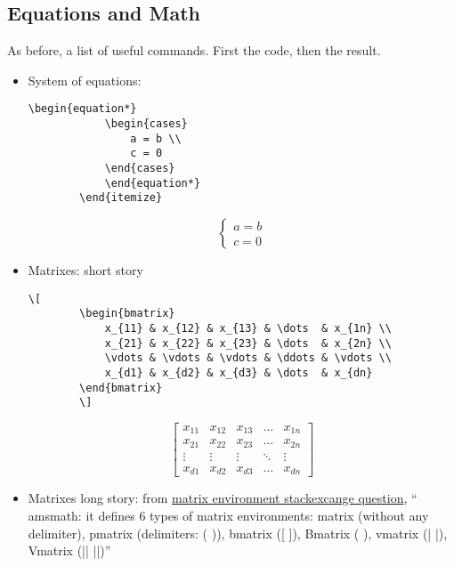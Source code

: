 



\subsection{Equations and Math}
\par As before, a list of useful commands. First the code, then the result.
\begin{itemize}
    \item System of equations:

    \begin{lstlisting}[language=Tex, numbers=none]
        \begin{equation*}
            \begin{cases}
                a = b \\
                c = 0
            \end{cases}
            \end{equation*}
        \end{itemize}        
    \end{lstlisting}
       
    \begin{equation*}
        \begin{cases}
            a = b \\
            c = 0
        \end{cases}
        \end{equation*}

    \item Matrixes: short story
    \begin{lstlisting}[language = Tex, numbers = none]
        \[
        \begin{bmatrix}
            x_{11} & x_{12} & x_{13} & \dots  & x_{1n} \\
            x_{21} & x_{22} & x_{23} & \dots  & x_{2n} \\
            \vdots & \vdots & \vdots & \ddots & \vdots \\
            x_{d1} & x_{d2} & x_{d3} & \dots  & x_{dn}
        \end{bmatrix}
        \]
    \end{lstlisting}

    \[
    \begin{bmatrix}
        x_{11} & x_{12} & x_{13} & \dots  & x_{1n} \\
        x_{21} & x_{22} & x_{23} & \dots  & x_{2n} \\
        \vdots & \vdots & \vdots & \ddots & \vdots \\
        x_{d1} & x_{d2} & x_{d3} & \dots  & x_{dn}
    \end{bmatrix}
    \]
    \item Matrixes long story: from \href{https://tex.stackexchange.com/questions/342385/matrix-operations-in-latex}{matrix environment stackexcange question}, `` amsmath: it defines 6 types of matrix environments: matrix (without any delimiter), pmatrix (delimiters: ( )), bmatrix ([ ]), Bmatrix ({ }), vmatrix (| |), Vmatrix (|| ||)''
    

\end{itemize}
